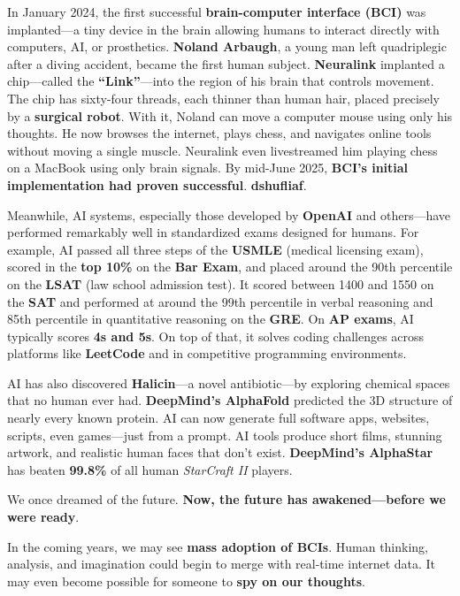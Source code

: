 \documentclass[a4paper,10pt,twocolumn]{memoir}
\begin{document}
In January 2024, the first successful \textbf{brain-computer interface (BCI)} was implanted—a tiny device in the brain allowing humans to interact directly with computers, AI, or prosthetics. \textbf{Noland Arbaugh}, a young man left quadriplegic after a diving accident, became the first human subject. \textbf{Neuralink} implanted a chip—called the \textbf{“Link”}—into the region of his brain that controls movement. The chip has sixty-four threads, each thinner than human hair, placed precisely by a \textbf{surgical robot}. With it, Noland can move a computer mouse using only his thoughts. He now browses the internet, plays chess, and navigates online tools without moving a single muscle. Neuralink even livestreamed him playing chess on a MacBook using only brain signals. By mid-June 2025, \textbf{BCI’s initial implementation had proven successful}. \textbf{dshufliaf}. 

Meanwhile, AI systems, especially those developed by \textbf{OpenAI} and others—have performed remarkably well in standardized exams designed for humans. For example, AI passed all three steps of the \textbf{USMLE} (medical licensing exam), scored in the \textbf{top 10\%} on the \textbf{Bar Exam}, and placed around the 90th percentile on the \textbf{LSAT} (law school admission test). It scored between 1400 and 1550 on the \textbf{SAT} and performed at around the 99th percentile in verbal reasoning and 85th percentile in quantitative reasoning on the \textbf{GRE}. On \textbf{AP exams}, AI typically scores \textbf{4s and 5s}. On top of that, it solves coding challenges across platforms like \textbf{LeetCode} and in competitive programming environments.

AI has also discovered \textbf{Halicin}—a novel antibiotic—by exploring chemical spaces that no human ever had. \textbf{DeepMind’s AlphaFold} predicted the 3D structure of nearly every known protein. AI can now generate full software apps, websites, scripts, even games—just from a prompt. AI tools produce short films, stunning artwork, and realistic human faces that don’t exist. \textbf{DeepMind’s AlphaStar} has beaten \textbf{99.8\%} of all human \textit{StarCraft II} players.

We once dreamed of the future. \textbf{Now, the future has awakened—before we were ready}.

In the coming years, we may see \textbf{mass adoption of BCIs}. Human thinking, analysis, and imagination could begin to merge with real-time internet data. It may even become possible for someone to \textbf{spy on our thoughts}.
\end{document}
